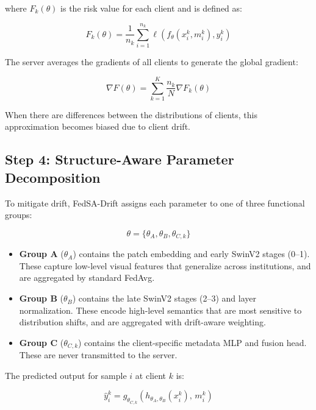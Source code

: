 \documentclass{ieeeaccess}
\newcommand{\sadrift}{FedSA-Drift}
\begin{document}
where $F_k(\theta)$ is the risk value for each client and is defined as:

\begin{equation}
\label{eq:local_risk}
F_k(\theta) = \frac{1}{n_k} \sum_{i=1}^{n_k} \ell(f_\theta(x_i^k,m_i^k), y_i^k)
\end{equation}

The server averages the gradients of all clients to generate the global gradient:

\begin{equation}
\label{eq:fed_gradient}
\nabla F(\theta) = \sum_{k=1}^{K} \frac{n_k}{N} \nabla F_k(\theta)
\end{equation}

When there are differences between the distributions of clients, this approximation becomes biased due to client drift.

\subsection{Step 4: Structure-Aware Parameter Decomposition}

To mitigate drift, \sadrift{} assigns each parameter to one of three functional groups:

\begin{equation}
\label{eq:param_decomp}
\theta = \{\theta_A, \theta_B, \theta_{C,k}\}
\end{equation}

\begin{itemize}
\item \textbf{Group A} ($\theta_A$) contains the patch embedding and early SwinV2 stages (0--1). These capture low-level visual features that generalize across institutions, and are aggregated by standard FedAvg.
\item \textbf{Group B} ($\theta_B$) contains the late SwinV2 stages (2--3) and layer normalization. These encode high-level semantics that are most sensitive to distribution shifts, and are aggregated with drift-aware weighting.
\item \textbf{Group C} ($\theta_{C,k}$) contains the client-specific metadata MLP and fusion head. These are never transmitted to the server.
\end{itemize}

The predicted output for sample $i$ at client $k$ is:

\begin{equation}
\label{eq:prediction}
\hat{y}_i^k = g_{\theta_{C,k}}\!\left(h_{\theta_A,\theta_B}(x_i^k),\, m_i^k\right)
\end{equation}
\end{document}
